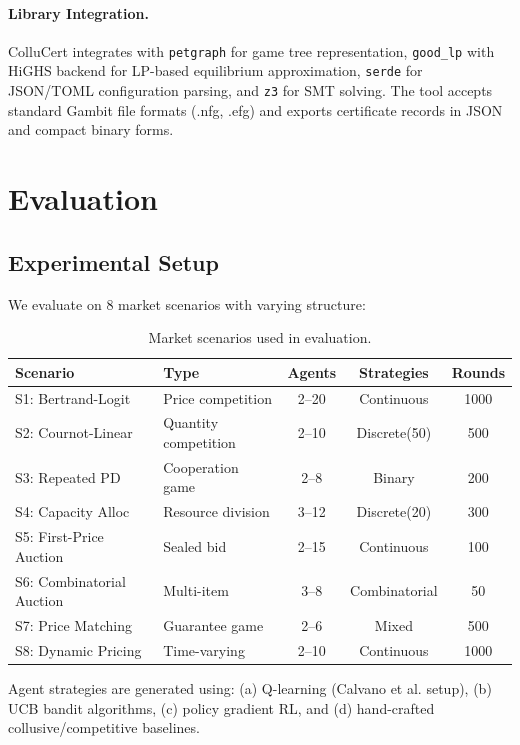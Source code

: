 \documentclass[11pt]{article}
\begin{document}
\paragraph{Library Integration.} ColluCert integrates with \texttt{petgraph} for game tree representation, \texttt{good\_lp} with HiGHS backend for LP-based equilibrium approximation, \texttt{serde} for JSON/TOML configuration parsing, and \texttt{z3} for SMT solving. The tool accepts standard Gambit file formats (.nfg, .efg) and exports certificate records in JSON and compact binary forms.

\section{Evaluation}
\label{sec:eval}

\subsection{Experimental Setup}

We evaluate on 8 market scenarios with varying structure:

\begin{table}[t]
\centering
\caption{Market scenarios used in evaluation.}
\small
\begin{tabular}{llccc}
\toprule
\textbf{Scenario} & \textbf{Type} & \textbf{Agents} & \textbf{Strategies} & \textbf{Rounds} \\
\midrule
S1: Bertrand-Logit & Price competition & 2--20 & Continuous & 1000 \\
S2: Cournot-Linear & Quantity competition & 2--10 & Discrete(50) & 500 \\
S3: Repeated PD & Cooperation game & 2--8 & Binary & 200 \\
S4: Capacity Alloc & Resource division & 3--12 & Discrete(20) & 300 \\
S5: First-Price Auction & Sealed bid & 2--15 & Continuous & 100 \\
S6: Combinatorial Auction & Multi-item & 3--8 & Combinatorial & 50 \\
S7: Price Matching & Guarantee game & 2--6 & Mixed & 500 \\
S8: Dynamic Pricing & Time-varying & 2--10 & Continuous & 1000 \\
\bottomrule
\end{tabular}
\end{table}

Agent strategies are generated using: (a) Q-learning (Calvano et al. setup), (b) UCB bandit algorithms, (c) policy gradient RL, and (d) hand-crafted collusive/competitive baselines.
\end{document}
